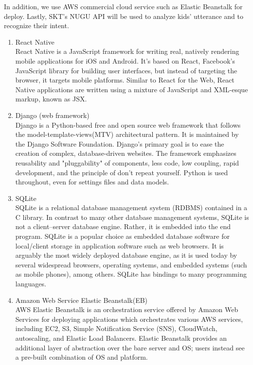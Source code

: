 \documentclass[conference]{IEEEtran}
\begin{document}
In addition, we use AWS commercial cloud service such as Elastic Beanstalk for deploy. Lastly, SKT’s NUGU API will be used to analyze kids’ utterance and to recognize their intent. 
\begin{enumerate}
    \item React Native\\
    React Native is a JavaScript framework for writing real, natively rendering mobile applications for iOS and Android. It’s based on React, Facebook’s JavaScript library for building user interfaces, but instead of targeting the browser, it targets mobile platforms. Similar to React for the Web, React Native applications are written using a mixture of JavaScript and XML-esque markup, known as JSX.\\
    \item Django (web framework)\\
    Django is a Python-based free and open source web framework that follows the model-template-views(MTV) architectural pattern. It is maintained by the Django Software Foundation. Django's primary goal is to ease the creation of complex, database-driven websites. The framework emphasizes reusability and "pluggability" of components, less code, low coupling, rapid development, and the principle of don't repeat yourself. Python is used throughout, even for settings files and data models.\\
    
    \item SQLite\\SQLite is a relational database management system (RDBMS) contained in a C library. In contrast to many other database management systems, SQLite is not a client–server database engine. Rather, it is embedded into the end program. SQLite is a popular choice as embedded database software for local/client storage in application software such as web browsers. It is arguably the most widely deployed database engine, as it is used today by several widespread browsers, operating systems, and embedded systems (such as mobile phones), among others. SQLite has bindings to many programming languages.\\
    
    \item Amazon Web Service Elastic Beanstalk(EB)\\
    AWS Elastic Beanstalk is an orchestration service offered by Amazon Web Services for deploying applications which orchestrates various AWS services, including EC2, S3, Simple Notification Service (SNS), CloudWatch, autoscaling, and Elastic Load Balancers. Elastic Beanstalk provides an additional layer of abstraction over the bare server and OS; users instead see a pre-built combination of OS and platform.\\
    

\end{enumerate}
\end{document}
